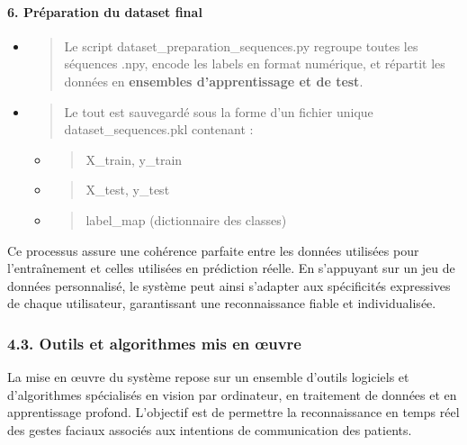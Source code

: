 \documentclass[
]{article}
\begin{document}
\hypertarget{pruxe9paration-du-dataset-final}{%
\paragraph{\texorpdfstring{\textbf{6. Préparation du dataset final}}{6. Préparation du dataset final}}\label{pruxe9paration-du-dataset-final}}

\begin{itemize}
\item
  \begin{quote}
  Le script dataset\_preparation\_sequences.py regroupe toutes les séquences .npy, encode les labels en format numérique, et répartit les données en \textbf{ensembles d'apprentissage et de test}.
  \end{quote}
\item
  \begin{quote}
  Le tout est sauvegardé sous la forme d'un fichier unique dataset\_sequences.pkl contenant :
  \end{quote}

  \begin{itemize}
  \item
    \begin{quote}
    X\_train, y\_train
    \end{quote}
  \item
    \begin{quote}
    X\_test, y\_test
    \end{quote}
  \item
    \begin{quote}
    label\_map (dictionnaire des classes)
    \end{quote}
  \end{itemize}
\end{itemize}

Ce processus assure une cohérence parfaite entre les données utilisées pour l'entraînement et celles utilisées en prédiction réelle. En s'appuyant sur un jeu de données personnalisé, le système peut ainsi s'adapter aux spécificités expressives de chaque utilisateur, garantissant une reconnaissance fiable et individualisée.

\hypertarget{outils-et-algorithmes-mis-en-ux153uvre}{%
\subsubsection{4.3. Outils et algorithmes mis en œuvre}\label{outils-et-algorithmes-mis-en-ux153uvre}}

La mise en œuvre du système repose sur un ensemble d'outils logiciels et d'algorithmes spécialisés en vision par ordinateur, en traitement de données et en apprentissage profond. L'objectif est de permettre la reconnaissance en temps réel des gestes faciaux associés aux intentions de communication des patients.
\end{document}
